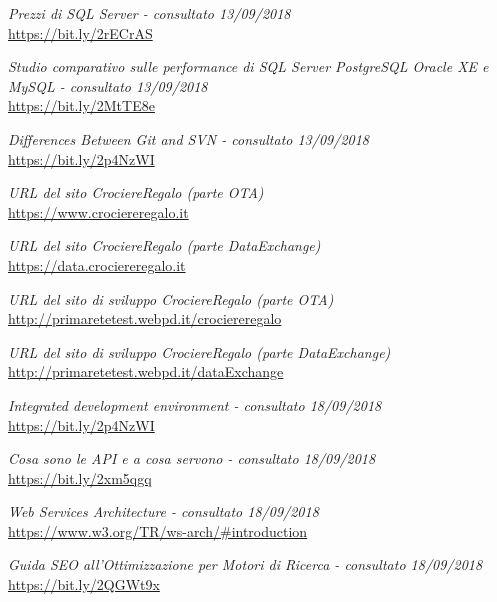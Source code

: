 
\cleardoublepage
\begin{thebibliography}{99}
	\textit{Prezzi di SQL Server - consultato 13/09/2018}\\
	\url{https://bit.ly/2rECrAS}
	
	\textit{Studio comparativo sulle performance di SQL Server PostgreSQL Oracle XE e MySQL - consultato 13/09/2018}\\
	\url{https://bit.ly/2MtTE8e}
		
	\textit{Differences Between Git and SVN  - consultato 13/09/2018}\\
	\url{https://bit.ly/2p4NzWI}

	\textit{URL del sito CrociereRegalo (parte OTA)}\\
	\url{https://www.crociereregalo.it}
		
	\textit{URL del sito CrociereRegalo (parte DataExchange)}\\
	\url{https://data.crociereregalo.it}
	
	\textit{URL del sito di sviluppo CrociereRegalo (parte OTA)}\\
	\url{http://primaretetest.webpd.it/crociereregalo}
	
	\textit{URL del sito di sviluppo CrociereRegalo (parte DataExchange)}\\
	\url{http://primaretetest.webpd.it/dataExchange}
	
	\textit{Integrated development environment - consultato 18/09/2018}\\
	\url{https://bit.ly/2p4NzWI}

	\textit{Cosa sono le API e a cosa servono - consultato 18/09/2018}\\
	\url{https://bit.ly/2xm5qgq}

	\textit{Web Services Architecture - consultato 18/09/2018}\\
	\url{https://www.w3.org/TR/ws-arch/\#introduction}

	\textit{Guida SEO all’Ottimizzazione per Motori di Ricerca - consultato 18/09/2018}\\
	\url{https://bit.ly/2QGWt9x}
	

\end{thebibliography}
